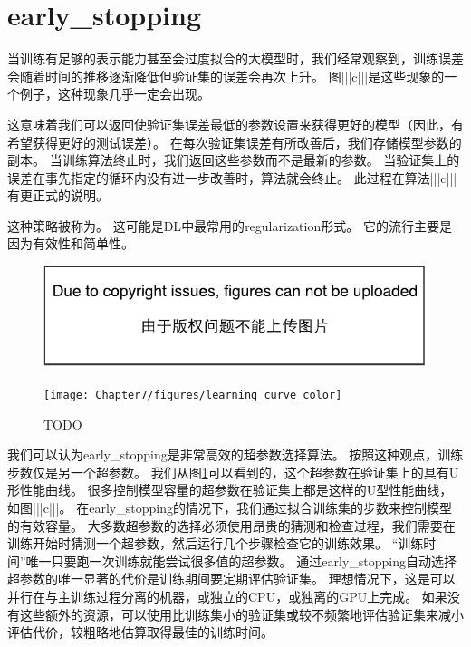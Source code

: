 
\section{\gls{early_stopping}}
\label{sec:early_stopping}
当训练有足够的表示能力甚至会过度拟合的大模型时，我们经常观察到，训练误差会随着时间的推移逐渐降低但验证集的误差会再次上升。
图|||c|||是这些现象的一个例子，这种现象几乎一定会出现。

这意味着我们可以返回使验证集误差最低的参数设置来获得更好的模型（因此，有希望获得更好的测试误差）。
在每次验证集误差有所改善后，我们存储模型参数的副本。
当训练算法终止时，我们返回这些参数而不是最新的参数。
当验证集上的误差在事先指定的循环内没有进一步改善时，算法就会终止。
此过程在算法|||c|||有更正式的说明。


这种策略被称为。
这可能是\gls{DL}中最常用的\gls{regularization}形式。
它的流行主要是因为有效性和简单性。

\begin{figure}[!htb]
\ifOpenSource
\centerline{\includegraphics{figure.pdf}}
\else
\centerline{\texttt{[image: Chapter7/figures/learning\_curve\_color]}}
\fi
\caption{TODO}
\label{fig:chap7_learning_curve_color}
\end{figure}

我们可以认为\gls{early_stopping}是非常高效的超参数选择算法。
按照这种观点，训练步数仅是另一个超参数。
我们从图\ref{fig:chap7_learning_curve_color}可以看到的，这个超参数在验证集上的具有U形性能曲线。
很多控制模型容量的超参数在验证集上都是这样的U型性能曲线，如图|||c|||。
在\gls{early_stopping}的情况下，我们通过拟合训练集的步数来控制模型的有效容量。
大多数超参数的选择必须使用昂贵的猜测和检查过程，我们需要在训练开始时猜测一个超参数，然后运行几个步骤检查它的训练效果。
``训练时间''唯一只要跑一次训练就能尝试很多值的超参数。
通过\gls{early_stopping}自动选择超参数的唯一显著的代价是训练期间要定期评估验证集。
理想情况下，这是可以并行在与主训练过程分离的机器，或独立的CPU，或独离的GPU上完成。
如果没有这些额外的资源，可以使用比训练集小的验证集或较不频繁地评估验证集来减小评估代价，较粗略地估算取得最佳的训练时间。

